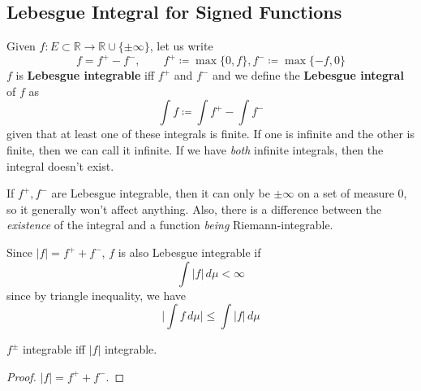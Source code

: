 \subsection{Lebesgue Integral for Signed Functions} 

  \begin{definition}
    Given $f: E \subset \mathbb{R} \to \mathbb{R} \cup \{\pm \infty\}$, let us write 
    \begin{equation}
      f = f^+ - f^-, \qquad f^+ \coloneqq \max \{0, f\}, f^- \coloneqq \max\{-f, 0\}
    \end{equation}
    $f$ is \textbf{Lebesgue integrable} iff $f^+$ and $f^-$ and we define the \textbf{Lebesgue integral} of $f$ as 
    \begin{equation}
      \int f \coloneqq \int f^+ - \int f^- 
    \end{equation}
    given that at least one of these integrals is finite. If one is infinite and the other is finite, then we can call it infinite. If we have \textit{both} infinite integrals, then the integral doesn't exist. 
  \end{definition} 

  If $f^+, f^-$ are Lebesgue integrable, then it can only be $\pm \infty$ on a set of measure $0$, so it generally won't affect anything. Also, there is a difference between the \textit{existence} of the integral and a function \textit{being} Riemann-integrable. 

  Since $|f| = f^+ + f^-$, $f$ is also Lebesgue integrable if 
  \begin{equation}
    \int |f| \, d\mu < \infty 
  \end{equation}
  since by triangle inequality, we have 
  \begin{equation}
    \bigg| \int f \, d\mu \bigg| \leq \int |f| \, d \mu
  \end{equation}

  \begin{theorem}
    $f^\pm$ integrable iff $|f|$ integrable. 
  \end{theorem}
  \begin{proof}
    $|f| = f^+ + f^-$. 
  \end{proof}

